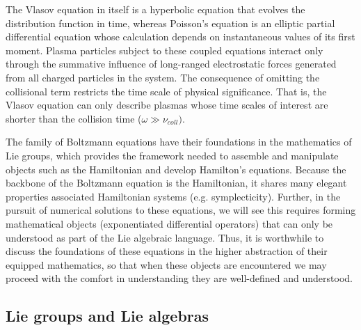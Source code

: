 \documentclass[11pt,titlepage]{report}
\begin{document}
\noindent The Vlasov equation in itself is a hyperbolic equation that evolves the distribution function in time, whereas Poisson's equation is an elliptic partial differential equation whose calculation depends on instantaneous values of its first moment. Plasma particles subject to these coupled equations interact only through the summative influence of long-ranged electrostatic forces generated from all charged particles in the system. The consequence of omitting the collisional term restricts the time scale of physical significance. That is, the Vlasov equation can only describe plasmas whose time scales of interest are shorter than the collision time ($\omega \gg \nu_{coll})$. 

The family of Boltzmann equations have their foundations in the mathematics of Lie groups, which provides the framework needed to assemble and manipulate objects such as the Hamiltonian and develop Hamilton's equations. Because the backbone of the Boltzmann equation is the Hamiltonian, it shares many elegant properties associated Hamiltonian systems (e.g. symplecticity). Further, in the pursuit of numerical solutions to these equations, we will see this requires forming mathematical objects (exponentiated differential operators) that can only be understood as part of the Lie algebraic language. Thus, it is worthwhile to discuss the foundations of these equations in the higher abstraction of their equipped mathematics, so that when these objects are encountered we may proceed with the comfort in understanding they are well-defined and understood.


\subsection{Lie groups and Lie algebras}
\end{document}
